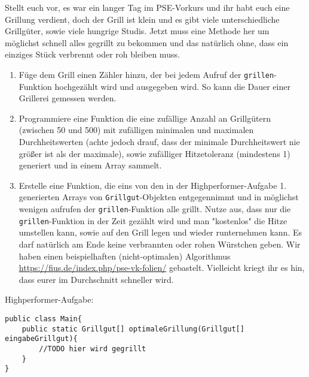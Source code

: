 \documentclass{../../sheet}
\begin{document}
\newpage
{}
Stellt euch vor, es war ein langer Tag im PSE-Vorkurs und ihr habt euch eine Grillung verdient, doch der Grill ist klein und es gibt viele unterschiedliche Grillgüter, sowie viele hungrige Studis. Jetzt muss eine Methode her um möglichst schnell alles gegrillt zu bekommen und das natürlich ohne, dass ein einziges Stück verbrennt oder roh bleiben muss.
\begin{enumerate}
    \item Füge dem Grill einen Zähler hinzu, der bei jedem Aufruf der \texttt{grillen}-Funktion hochgezählt wird und ausgegeben wird. So kann die Dauer einer Grillerei gemessen werden.
    \item Programmiere eine Funktion die eine zufällige Anzahl an Grillgütern (zwischen 50 und 500) mit zufälligen minimalen und maximalen Durchheitswerten (achte jedoch drauf, dass der minimale Durchheitswert nie größer ist als der maximale), sowie zufälliger Hitzetoleranz (mindestens 1) generiert und in einem Array sammelt.
    \item Erstelle eine Funktion, die eins von den in der Highperformer-Aufgabe 1. generierten Arrays von \texttt{Grillgut}-Objekten entgegennimmt und in möglichst wenigen aufrufen der \texttt{grillen}-Funktion alle grillt. Nutze aus, dass nur die \texttt{grillen}-Funktion in der Zeit gezählt wird und man "kostenlos" die Hitze umstellen kann, sowie auf den Grill legen und wieder runternehmen kann. Es darf natürlich am Ende keine verbrannten oder rohen Würstchen geben. Wir haben einen beispielhaften (nicht-optimalen) Algorithmus \url{https://fius.de/index.php/pse-vk-folien/} gebastelt. Vielleicht kriegt ihr es hin, dass eurer im Durchschnitt schneller wird.
\end{enumerate}

\newpage
{}
Highperformer-Aufgabe:
\hypertarget{Highperformer}{}
\begin{verbatim}
public class Main{
    public static Grillgut[] optimaleGrillung(Grillgut[] eingabeGrillgut){
        //TODO hier wird gegrillt
    }
}
\end{verbatim}
\end{document}
